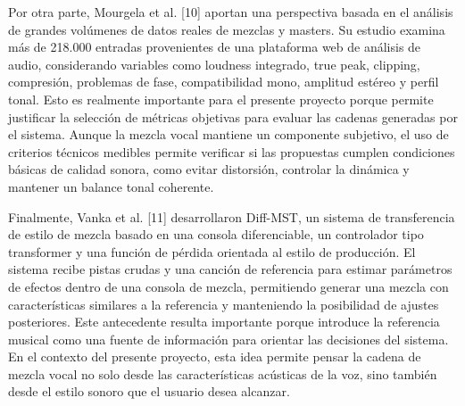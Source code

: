 Por otra parte, Mourgela et al. [10] aportan una perspectiva basada en el análisis de grandes volúmenes de datos reales de mezclas y masters. Su estudio examina más de 218.000 entradas provenientes de una plataforma web de análisis de audio, considerando variables como loudness integrado, true peak, clipping, compresión, problemas de fase, compatibilidad mono, amplitud estéreo y perfil tonal. Esto es realmente importante para el presente proyecto porque permite justificar la selección de métricas objetivas para evaluar las cadenas generadas por el sistema. Aunque la mezcla vocal mantiene un componente subjetivo, el uso de criterios técnicos medibles permite verificar si las propuestas cumplen condiciones básicas de calidad sonora, como evitar distorsión, controlar la dinámica y mantener un balance tonal coherente.

Finalmente, Vanka et al. [11] desarrollaron Diff-MST, un sistema de transferencia de estilo de mezcla basado en una consola diferenciable, un controlador tipo transformer y una función de pérdida orientada al estilo de producción. El sistema recibe pistas crudas y una canción de referencia para estimar parámetros de efectos dentro de una consola de mezcla, permitiendo generar una mezcla con características similares a la referencia y manteniendo la posibilidad de ajustes posteriores. Este antecedente resulta importante porque introduce la referencia musical como una fuente de información para orientar las decisiones del sistema. En el contexto del presente proyecto, esta idea permite pensar la cadena de mezcla vocal no solo desde las características acústicas de la voz, sino también desde el estilo sonoro que el usuario desea alcanzar.
